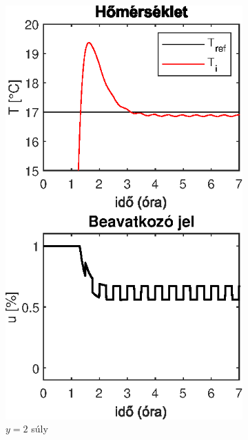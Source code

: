 \begin{figure}[H]
\begin{subfigure}[t]{0.32\textwidth}
		\includegraphics[width=\textwidth]{figures/realsys/mpc-wy-2}
		\caption{$y=2$ súly}
		\label{fig:mpc-wy-2}
	\end{subfigure}
	~
	\begin{subfigure}[t]{0.32\textwidth}
		\centering

\end{subfigure}
\end{figure}
